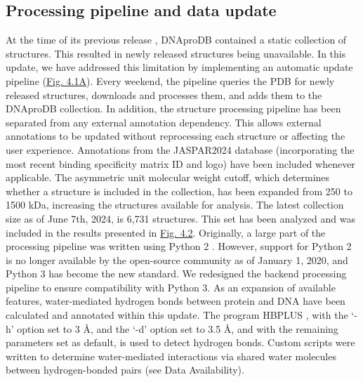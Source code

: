 \subsection{Processing pipeline and data update}
At the time of its previous release \citep{Sagendorf2020}, DNAproDB contained a static collection of structures. This resulted in newly released structures being unavailable. In this update, we have addressed this limitation by implementing an automatic update pipeline (\hyperref[fig:dnaprodb1]{Fig. 4.1A}). Every weekend, the pipeline queries the PDB for newly released structures, downloads and processes them, and adds them to the DNAproDB collection. 
In addition, the structure processing pipeline has been separated from any external annotation dependency. This allows external annotations to be updated without reprocessing each structure or affecting the user experience. Annotations from the JASPAR2024 \citep{Rauluseviciute2024} database (incorporating the most recent binding specificity matrix ID and logo) have been included whenever applicable. 
The asymmetric unit molecular weight cutoff, which determines whether a structure is included in the collection, has been expanded from 250 to 1500 kDa, increasing the structures available for analysis. The latest collection size as of June 7th, 2024, is 6,731 structures. This set has been analyzed and was included in the results presented in \hyperref[fig:dnaprodb2]{Fig. 4.2}. 
Originally, a large part of the processing pipeline was written using Python 2 \citep{Guido1995}. However, support for Python 2 is no longer available by the open-source community as of January 1, 2020, and Python 3 \citep{Guido2009} has become the new standard. We redesigned the backend processing pipeline to ensure compatibility with Python 3. 
As an expansion of available features, water-mediated hydrogen bonds between protein and DNA have been calculated and annotated within this update. The program HBPLUS \citep{McDonald1994}, with the ‘-h’ option set to 3 \AA, and the ‘-d’ option set to 3.5 \AA, and with the remaining parameters set as default, is used to detect hydrogen bonds. Custom scripts were written to determine water-mediated interactions via shared water molecules between hydrogen-bonded pairs (see Data Availability).  

